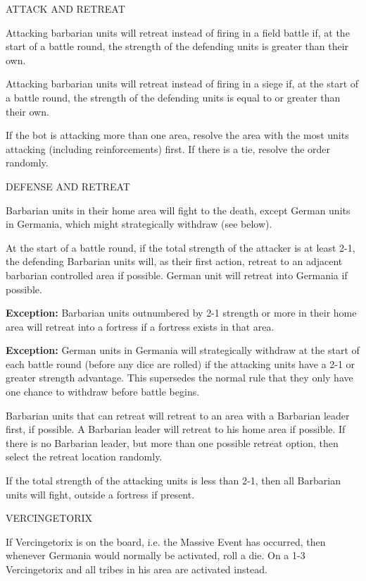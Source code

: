 \label{solitaire:attack_and_retreat}ATTACK AND RETREAT
 
Attacking barbarian units will retreat instead of firing in a field battle if, at the start of a battle round, the strength of the defending units is greater than their own.

Attacking barbarian units will retreat instead of firing in a siege if, at the start of a battle round, the strength of the defending units is equal to or greater than their own.

If the bot is attacking more than one area, resolve the area with the most units attacking (including reinforcements) first. If there is a tie, resolve the order randomly.
  
\label{solitaire:defense_and_retreat}DEFENSE AND RETREAT

Barbarian units in their home area will fight to the death, except German units in Germania, which might strategically withdraw (see below).

At the start of a battle round, if the total strength of the attacker is at least 2-1, the defending Barbarian units will, as their first action, retreat to an adjacent barbarian controlled area if possible. German unit will retreat into Germania if possible.
    
\textbf{Exception:} Barbarian units outnumbered by 2-1 strength or more in their home area will retreat into a fortress if a fortress exists in that area.
    
\textbf{Exception:} German units in Germania will strategically withdraw at the start of each battle round (before any dice are rolled) if the attacking units have a 2-1 or greater strength advantage. This supersedes the normal rule that they only have one chance to withdraw before battle begins.

Barbarian units that can retreat will retreat to an area with a Barbarian leader first, if possible. A Barbarian leader will retreat to his home area if possible. If there is no Barbarian leader, but more than one possible retreat option, then select the retreat location randomly.

If the total strength of the attacking units is less than 2-1, then all Barbarian units will fight, outside a fortress if present.

  
\label{solitaire:vercingetorix}VERCINGETORIX

If Vercingetorix is on the board, i.e. the Massive Event has occurred, then whenever Germania would normally be activated, roll a die. On a 1-3 Vercingetorix and all tribes in his area are activated instead.
    
